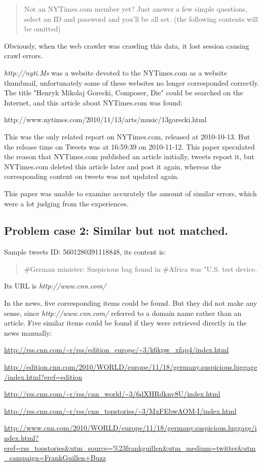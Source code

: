 \begin{quote}
Not an NYTimes.com member yet? Just answer a few simple questions, select an ID and password and you'll be all set. (the following contents will be omitted)
\end{quote}

Obviously, when the web crawler was crawling this data, it lost session causing crawl errors.

\textit{http://nyti.Ms} was a website devoted to the NYTimes.com as a website thumbnail, unfortunately some of these websites no longer corresponded correctly.  The title "Henryk Mikolaj Gorecki, Composer, Die" could be searched on the Internet, and this article about NYTimes.com was found:

http://www.nytimes.com/2010/11/13/arts/music/13gorecki.html

This was the only related report on NYTimes.com, released at 2010-10-13. But the release time on Tweets was at 16:59:39 on 2010-11-12. This paper speculated the reason that NYTimes.com published an article initially, tweets repost it, but NYTimes.com deleted this article later and post it again, whereas the corresponding content on tweets was not updated again.

This paper was unable to examine accurately the amount of similar errors, which were a lot judging from the experiences. 

\subsection{Problem case 2: Similar but not matched.}

Sample tweets ID: 5601280391118848, its content is:

\begin{quote}
\#German minister: Suspicious bag found in \#Africa was "U.S. test device.
\end{quote}

Its URL is \textit{http://www.cnn.com/}

In the news, five corresponding items could be found. But they did not make any sense, since \textit{http://www.cnn.com/} referred to a domain name rather than an article. Five similar items could be found if they were retrieved directly in the news manually: 

\begin{description}
	\item \url{http://rss.cnn.com/~r/rss/edition_europe/~3/k6kpw_xfap4/index.html}
	\item \url{http://edition.cnn.com/2010/WORLD/europe/11/18/germany.suspicious.luggage/index.html?eref=edition}
	\item \url{http://rss.cnn.com/~r/rss/cnn_world/~3/6dXHRdknv8U/index.html}
	\item \url{http://rss.cnn.com/~r/rss/cnn_topstories/~3/MxFEbwAOM-I/index.html}
	\item \url{http://www.cnn.com/2010/WORLD/europe/11/18/germany.suspicious.luggage/index.html?eref=rss_topstories&utm_source=\%23frankguillen&utm_medium=twitter&utm_campaign=FrankGuillen+Buzz}
\end{description}

